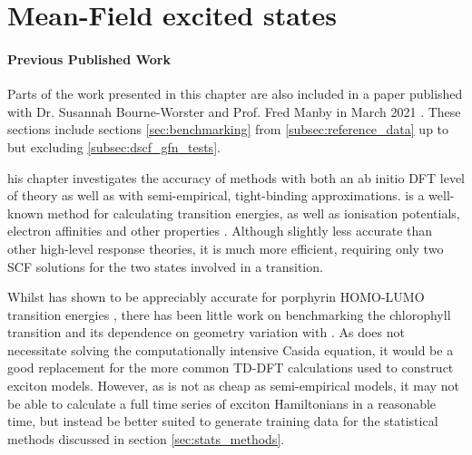 %
%
\chapter{Mean-Field excited states}
\label{chap:dscf}

\subsubsection*{Previous Published Work}
Parts of the work presented in this chapter are also included in a paper published 
with Dr. Susannah Bourne-Worster and Prof. Fred Manby in March 2021 \cite{Worster2021}. 
These sections include sections \ref{sec:benchmarking} from \ref{subsec:reference_data}
up to but excluding \ref{subsec:dscf_gfn_tests}.

his chapter investigates the accuracy of \dscf methods with both an 
ab initio DFT level of theory as well as with semi-empirical, tight-binding approximations.
\dscf is a well-known method for calculating transition energies, as well as ionisation
potentials, electron affinities and other properties \cite{Hunt1969, Kowalczyk2011, Terranova2013, Lutsker2015}. Although slightly
less accurate than other high-level response theories, it is much more efficient,
requiring only two SCF solutions for the two states involved in a transition. 

Whilst \dscf has shown to be appreciably accurate for porphyrin HOMO-LUMO transition
energies \cite{Kowalczyk2011}, there has been little work on benchmarking the chlorophyll
\Qy transition and its dependence on geometry variation with \dscf. As \dscf does
not necessitate solving the computationally intensive Casida equation, it would be
a good replacement for the more common TD-DFT calculations used to construct exciton
models. However, as \dscf is not as cheap as semi-empirical models, it may not be
able to calculate a full time series of exciton Hamiltonians in a reasonable time,
but instead be better suited to generate training data for the statistical methods
discussed in section \ref{sec:stats_methods}.


